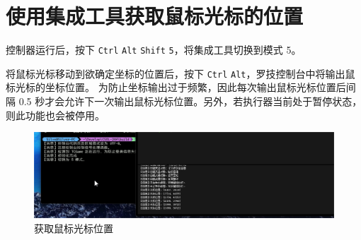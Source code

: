\section{使用集成工具获取鼠标光标的位置}

控制器运行后，按下 \lstinline{Ctrl} \lstinline{Alt} \lstinline{Shift} \lstinline{5}，将集成工具切换到模式 5。

将鼠标光标移动到欲确定坐标的位置后，按下 \lstinline{Ctrl} \lstinline{Alt}，罗技控制台中将输出鼠标光标的坐标位置。
为防止坐标输出过于频繁，因此每次输出鼠标光标位置后间隔 0.5 秒才会允许下一次输出鼠标光标位置。另外，若执行器当前处于暂停状态，则此功能也会被停用。

\begin{figure}[H]
    \Centering
    \includegraphics[width=\textwidth]{documents/assets/position.png}
    \caption{获取鼠标光标位置}
\end{figure}